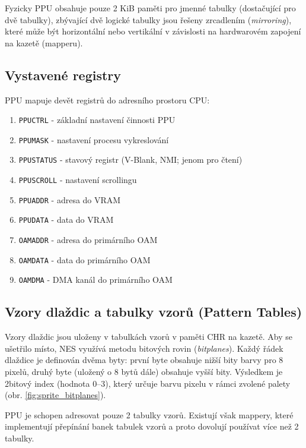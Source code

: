 Fyzicky PPU obsahuje pouze 2 KiB paměti pro jmenné tabulky (dostačující pro dvě tabulky), zbývající
dvě logické tabulky jsou řešeny zrcadlením (\textit{mirroring}), které může být horizontální nebo
vertikální v závislosti na hardwarovém zapojení na kazetě (mapperu).

\subsection{Vystavené registry}

PPU mapuje devět registrů do adresního prostoru CPU:

\begin{enumerate}
    \item \texttt{PPUCTRL} - základní nastavení činnosti PPU
    \item \texttt{PPUMASK} - nastavení procesu vykreslování
    \item \texttt{PPUSTATUS} - stavový registr (V-Blank, NMI; jenom pro čtení)
    \item \texttt{PPUSCROLL} - nastavení scrollingu
    \item \texttt{PPUADDR} - adresa do VRAM
    \item \texttt{PPUDATA} - data do VRAM
    \item \texttt{OAMADDR} - adresa do primárního OAM
    \item \texttt{OAMDATA} - data do primárního OAM
    \item \texttt{OAMDMA} - DMA kanál do primárního OAM
\end{enumerate}

\subsection{Vzory dlaždic a tabulky vzorů (Pattern Tables)}

Vzory dlaždic jsou uloženy v tabulkách vzorů v paměti CHR na kazetě. Aby se ušetřilo místo, NES
využívá metodu bitových rovin (\textit{bitplanes}). Každý řádek dlaždice je definován dvěma byty:
první byte obsahuje nižší bity barvy pro 8 pixelů, druhý byte (uložený o 8 bytů dále) obsahuje vyšší
bity. Výsledkem je 2bitový index (hodnota 0--3), který určuje barvu pixelu v rámci zvolené palety
(obr. \ref{fig:sprite_bitplanes}).

PPU je schopen adresovat pouze 2 tabulky vzorů. Existují však mappery, které implementují
přepínání banek tabulek vzorů a proto dovolují používat více než 2 tabulky.

